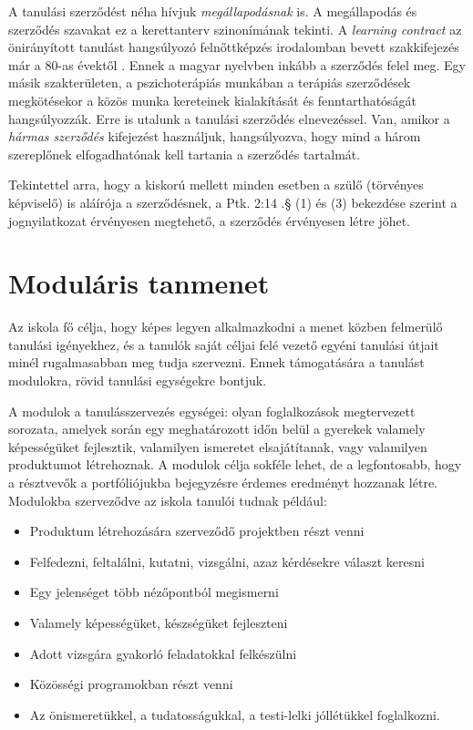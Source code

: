 A tanulási szerződést néha hívjuk \emph{megállapodásnak} is. A megállapodás és
szerződés szavakat ez a kerettanterv szinonímának tekinti. A \emph{learn\-ing
  con\-tract} az önirányított tanulást hangsúlyozó felnőttképzés irodalomban
bevett szakkifejezés már a 80-as évektől \citep{Malcolm77}. Ennek a magyar
nyelvben inkább a szerződés felel meg. Egy másik szakterületen, a
pszichoterápiás munkában a terápiás szerződések megkötésekor a közös munka
kereteinek kialakítását és fenntarthatóságát hangsúlyozzák.
\citep{pszichoterapia} Erre is utalunk a tanulási szerződés elnevezéssel. Van,
amikor a \emph{hármas szerződés} kifejezést használjuk, hangsúlyozva, hogy mind
a három szereplőnek elfogadhatónak kell tartania a szerződés tartalmát.

Tekintettel arra, hogy a kiskorú mellett minden esetben a szülő (törvényes
képviselő) is aláírója a szerződésnek, a Ptk. 2:14 .§ (1) és (3) bekezdése
szerint a jognyilatkozat érvényesen megtehető, a szerződés érvényesen létre
jöhet.

\section{Moduláris tanmenet}
\label{sec:modularis_tanmenet}

Az iskola fő célja, hogy képes legyen alkalmazkodni a menet közben felmerülő
tanulási igényekhez, és a tanulók saját céljai felé vezető egyéni tanulási
útjait minél rugalmasabban meg tudja szervezni. Ennek támogatására a tanulást
modulokra, rövid tanulási egységekre bontjuk.

A modulok a tanulásszervezés egységei: olyan foglalkozások megtervezett
sorozata, amelyek során egy meghatározott időn belül a gyerekek valamely
képességüket fejlesztik, valamilyen ismeretet elsajátítanak, vagy valamilyen
produktumot létrehoznak. A modulok célja sokféle lehet, de a legfontosabb, hogy
a résztvevők a portfóliójukba bejegyzésre érdemes eredményt hozzanak létre.
Modulokba szerveződve az iskola tanulói tudnak például:

\begin{itemize}
  \item Produktum létrehozására szerveződő projektben részt venni
  \item Felfedezni, feltalálni, kutatni, vizsgálni, azaz kérdésekre választ
        keresni
  \item Egy jelenséget több nézőpontból megismerni
  \item Valamely képességüket, készségüket fejleszteni
  \item Adott vizsgára gyakorló feladatokkal felkészülni
  \item Közösségi programokban részt venni
  \item Az önismeretükkel, a tudatosságukkal, a testi-lelki jóllétükkel
        foglalkozni.
\end{itemize}

